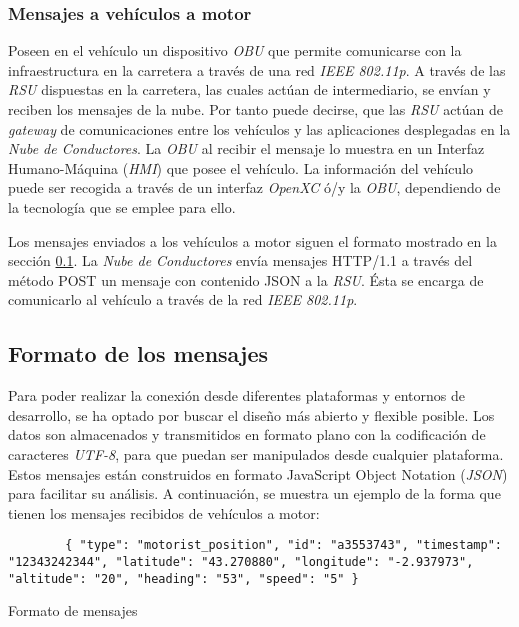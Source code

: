 \subsubsection{Mensajes a vehículos a motor}\label{sssection:mensajesvehiculomotor}
Poseen en el vehículo un dispositivo \emph{OBU} que permite comunicarse con la infraestructura en la carretera a través de una red \emph{IEEE 802.11p}. A través de las \emph{RSU} dispuestas en la carretera, las cuales actúan de intermediario, se envían y reciben los mensajes de la nube. Por tanto puede decirse, que las \emph{RSU} actúan de \emph{gateway} de comunicaciones entre los vehículos y las aplicaciones desplegadas en la \emph{Nube de Conductores}. La \emph{OBU} al recibir el mensaje lo muestra en un Interfaz Humano-Máquina (\emph{HMI}) que posee el vehículo. La información del vehículo puede ser recogida a través de un interfaz \emph{OpenXC} ó/y la \emph{OBU}, dependiendo de la tecnología que se emplee para ello.

Los mensajes enviados a los vehículos a motor siguen el formato mostrado en la sección \ref{ssection:FormatoMensajesNC}. La \emph{Nube de Conductores} envía mensajes HTTP/1.1 a través del método POST un mensaje con contenido JSON a la \emph{RSU}. \'Esta se encarga de comunicarlo al vehículo a través de la red \emph{IEEE 802.11p}.


\subsection{Formato de los mensajes}\label{ssection:FormatoMensajesNC}
Para poder realizar la conexión desde diferentes plataformas y entornos de desarrollo, se ha optado por buscar el diseño más abierto y flexible posible. Los datos son almacenados y transmitidos en formato plano con la codificación de caracteres \emph{UTF-8}, para que puedan ser manipulados desde cualquier plataforma. Estos mensajes están construidos en formato JavaScript Object Notation (\emph{JSON}) para facilitar su análisis. A continuación, se muestra un ejemplo de la forma que tienen los mensajes recibidos de vehículos a motor:

\begin{listing}
	\begin{minipage}{.4\textwidth}
		\begin{verbatim}
		{ "type": "motorist_position", "id": "a3553743", "timestamp": "12343242344", "latitude": "43.270880", "longitude": "-2.937973", "altitude": "20", "heading": "53", "speed": "5" }			\end{verbatim}
	\end{minipage}
	\caption{Formato de mensajes}\label{alg:formatoMensajes}
\end{listing}

